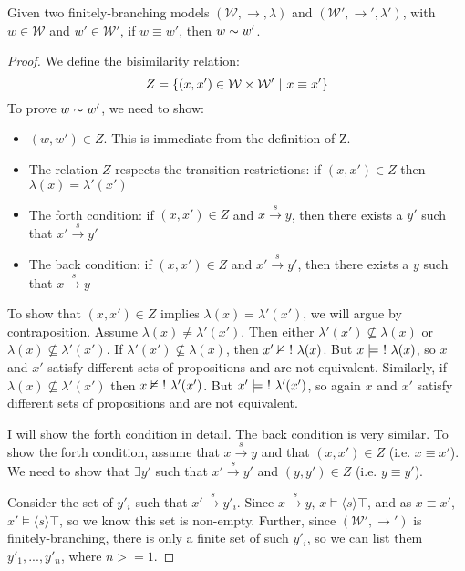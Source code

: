 \begin{case}
Given two finitely-branching models $(\mathcal{W}, \rightarrow,
\lambda)$ and $(\mathcal{W}', \rightarrow', \lambda')$, with $w \in
\mathcal{W}$ and $w' \in \mathcal{W}'$, if $w \equiv w'$, then $w
\sim w'$.
\end{case}
\begin{proof}
We define the bisimilarity relation:
\[
Z = \{(x,x') \in \mathcal{W} \times \mathcal{W}' \ | \  x \equiv x' \}
\]
To prove $w \sim w'$, we need to show:
\begin{itemize}
\item
$(w,w') \in Z$. This is immediate from the definition of Z.
\item
The relation $Z$ respects the transition-restrictions: if $(x,x') \in Z$ then $\lambda(x) = \lambda'(x')$
\item
The forth condition: if $(x,x') \in Z$ and $x \xrightarrow{s} y$, then there exists a $y'$ such that $x' \xrightarrow{s} y'$
\item
The back condition: if $(x,x') \in Z$ and $x' \xrightarrow{s} y'$, then there exists a $y$ such that $x \xrightarrow{s} y$
\end{itemize}
To show that $(x,x') \in Z$ implies $\lambda(x) = \lambda'(x')$, we will argue by contraposition.
Assume $\lambda(x) \neq \lambda'(x')$.
Then either $\lambda'(x') \nsubseteq  \lambda(x)$ or $\lambda(x) \nsubseteq  \lambda'(x')$.
If $\lambda'(x') \nsubseteq  \lambda(x)$, then $x' \nvDash \ ! \  \lambda(x)$.
But $x \models \ ! \  \lambda(x)$, so $x$ and $x'$ satisfy different sets of propositions and are not equivalent.
Similarly, if $\lambda(x) \nsubseteq  \lambda'(x')$ then $x \nvDash \ ! \  \lambda'(x')$.
But $x' \models \ ! \  \lambda'(x')$, so again $x$ and $x'$ satisfy different sets of propositions and are not equivalent.

I will show the forth condition in detail. The back condition is very similar.
To show the forth condition, assume that  $x \xrightarrow{s} y$ and that $(x,x') \in Z$ (i.e. $x \equiv x'$).
We need to show that $\exists y'$ such that $x' \xrightarrow{s} y'$ and $(y,y') \in Z$ (i.e. $y \equiv y'$).

Consider the set of $y'_i$ such that $x' \xrightarrow{s} y'_i$. Since $x \xrightarrow{s} y$, $x \models \langle s \rangle \top$, and as $x \equiv x'$,  $x' \models \langle s \rangle \top$, so we know this set is non-empty.
Further, since $(\mathcal{W}', \rightarrow')$ is finitely-branching, there is only a finite set of such $y'_i$, so we can list them $y'_1, ..., y'_n$,  where $n >= 1$.


\end{proof}

